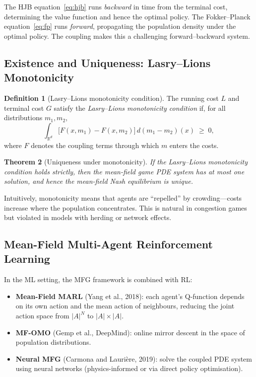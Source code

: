 \documentclass[11pt,a4paper]{article}
\theoremstyle{plain}
\newtheorem{theorem}{Theorem}[section]
\theoremstyle{definition}
\newtheorem{definition}[theorem]{Definition}
\newcommand{\R}{\mathbb{R}}
\begin{document}
The HJB equation~\eqref{eq:hjb} runs \emph{backward} in time from the
terminal cost, determining the value function and hence the optimal
policy.  The Fokker--Planck equation~\eqref{eq:fp} runs \emph{forward},
propagating the population density under the optimal policy.  The
coupling makes this a challenging forward--backward system.

\subsection{Existence and Uniqueness: Lasry--Lions Monotonicity}

\begin{definition}[Lasry--Lions monotonicity condition]
The running cost $L$ and terminal cost $G$ satisfy the \emph{Lasry--Lions
monotonicity condition} if, for all distributions $m_1, m_2$,
\[
  \int_{\R^d} \bigl[F(x, m_1) - F(x, m_2)\bigr]\,d(m_1 - m_2)(x)
  \;\geq\; 0,
\]
where $F$ denotes the coupling terms through which $m$ enters the costs.
\end{definition}

\begin{theorem}[Uniqueness under monotonicity]
If the Lasry--Lions monotonicity condition holds strictly, then the
mean-field game PDE system has at most one solution, and hence the
mean-field Nash equilibrium is unique.
\end{theorem}

Intuitively, monotonicity means that agents are ``repelled'' by
crowding---costs increase where the population concentrates.  This is
natural in congestion games but violated in models with herding or
network effects.

\subsection{Mean-Field Multi-Agent Reinforcement Learning}

In the ML setting, the MFG framework is combined with RL:

\begin{itemize}
  \item \textbf{Mean-Field MARL} (Yang et al., 2018): each agent's
    Q-function depends on its own action and the mean action of
    neighbours, reducing the joint action space from $|A|^N$ to
    $|A| \times |A|$.
  \item \textbf{MF-OMO} (Gemp et al., DeepMind): online mirror descent
    in the space of population distributions.
  \item \textbf{Neural MFG} (Carmona and Lauri\`ere, 2019): solve the
    coupled PDE system using neural networks (physics-informed or via
    direct policy optimisation).
\end{itemize}
\end{document}
